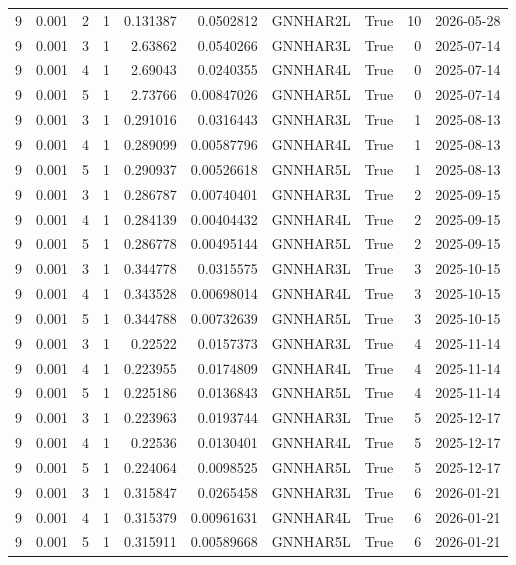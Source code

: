 \begin{tabular}{rrrrrrlrrl}
9 & 0.001 & 2 & 1 & 0.131387 & 0.0502812 & GNNHAR2L & True & 10 & 2026-05-28 \\
9 & 0.001 & 3 & 1 & 2.63862 & 0.0540266 & GNNHAR3L & True & 0 & 2025-07-14 \\
9 & 0.001 & 4 & 1 & 2.69043 & 0.0240355 & GNNHAR4L & True & 0 & 2025-07-14 \\
9 & 0.001 & 5 & 1 & 2.73766 & 0.00847026 & GNNHAR5L & True & 0 & 2025-07-14 \\
9 & 0.001 & 3 & 1 & 0.291016 & 0.0316443 & GNNHAR3L & True & 1 & 2025-08-13 \\
9 & 0.001 & 4 & 1 & 0.289099 & 0.00587796 & GNNHAR4L & True & 1 & 2025-08-13 \\
9 & 0.001 & 5 & 1 & 0.290937 & 0.00526618 & GNNHAR5L & True & 1 & 2025-08-13 \\
9 & 0.001 & 3 & 1 & 0.286787 & 0.00740401 & GNNHAR3L & True & 2 & 2025-09-15 \\
9 & 0.001 & 4 & 1 & 0.284139 & 0.00404432 & GNNHAR4L & True & 2 & 2025-09-15 \\
9 & 0.001 & 5 & 1 & 0.286778 & 0.00495144 & GNNHAR5L & True & 2 & 2025-09-15 \\
9 & 0.001 & 3 & 1 & 0.344778 & 0.0315575 & GNNHAR3L & True & 3 & 2025-10-15 \\
9 & 0.001 & 4 & 1 & 0.343528 & 0.00698014 & GNNHAR4L & True & 3 & 2025-10-15 \\
9 & 0.001 & 5 & 1 & 0.344788 & 0.00732639 & GNNHAR5L & True & 3 & 2025-10-15 \\
9 & 0.001 & 3 & 1 & 0.22522 & 0.0157373 & GNNHAR3L & True & 4 & 2025-11-14 \\
9 & 0.001 & 4 & 1 & 0.223955 & 0.0174809 & GNNHAR4L & True & 4 & 2025-11-14 \\
9 & 0.001 & 5 & 1 & 0.225186 & 0.0136843 & GNNHAR5L & True & 4 & 2025-11-14 \\
9 & 0.001 & 3 & 1 & 0.223963 & 0.0193744 & GNNHAR3L & True & 5 & 2025-12-17 \\
9 & 0.001 & 4 & 1 & 0.22536 & 0.0130401 & GNNHAR4L & True & 5 & 2025-12-17 \\
9 & 0.001 & 5 & 1 & 0.224064 & 0.0098525 & GNNHAR5L & True & 5 & 2025-12-17 \\
9 & 0.001 & 3 & 1 & 0.315847 & 0.0265458 & GNNHAR3L & True & 6 & 2026-01-21 \\
9 & 0.001 & 4 & 1 & 0.315379 & 0.00961631 & GNNHAR4L & True & 6 & 2026-01-21 \\
9 & 0.001 & 5 & 1 & 0.315911 & 0.00589668 & GNNHAR5L & True & 6 & 2026-01-21 \\

\end{tabular}
